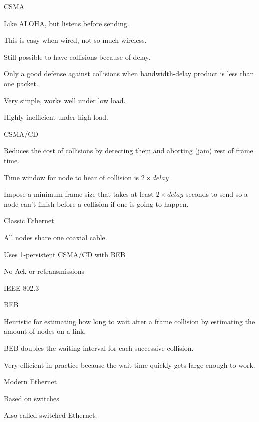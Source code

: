 \documentclass[main.tex]{subfiles}
\begin{document}
\begin{card}{CSMA}
\item Like ALOHA, but listens before sending.
\item This is easy when wired, not so much wireless.
\item Still possible to have collisions because of delay.
\item Only a good defense against collisions when bandwidth-delay product is less than one packet.
\item Very simple, works well under low load.
\item Highly inefficient under high load.
\end{card}

\begin{card}{CSMA/CD}
\item Reduces the cost of collisions by detecting them and aborting (jam) rest of frame time.
\item Time window for node to hear of collision is $2\times delay$
\item Impose a minimum frame size that takes at least $2\times delay$ seconds to send so a node can't finish before a collision if one is going to happen.
\end{card}

\begin{card}{Classic Ethernet}
\item All nodes share one coaxial cable.
\item Uses 1-persistent CSMA/CD with BEB
\item No Ack or retransmissions
\item IEEE 802.3
\end{card}

\begin{card}{BEB}
\item Heuristic for estimating how long to wait after a frame collision by estimating the amount of nodes on a link.
\item BEB doubles the waiting interval for each successive collision.
\item Very efficient in practice because the wait time quickly gets large enough to work.
\end{card}

\begin{card}{Modern Ethernet}
\item Based on switches
\item Also called switched Ethernet.
\end{card}
\end{document}

